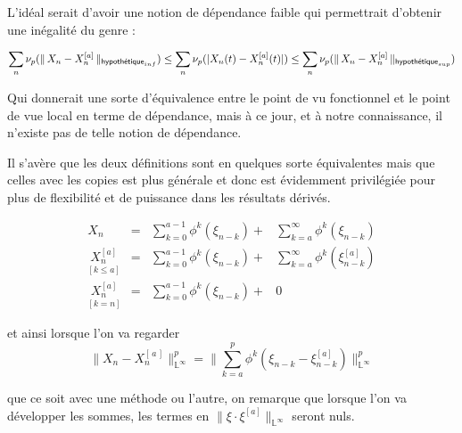 L'idéal serait d'avoir une notion de dépendance faible qui permettrait d'obtenir une inégalité du genre :

$$\sum_n \nu_p(\distnorme {\textsf{hypothétique}_{inf}} {X_n}{X_n^{[a]}}) \leq \sum_n \nu_p( |X_n(t) - X_n^{[a]}(t)| ) \leq \sum_n \nu_p(\distnorme {\textsf{hypothétique}_{sup}} {X_n}{X_n^{[a]}})$$

Qui donnerait une sorte d'équivalence entre le point de vu fonctionnel et le point de vue local en terme de dépendance, mais à ce jour, et à notre connaissance, il n'existe pas de telle notion de dépendance.


Il s'avère que les deux définitions sont en quelques sorte \og équivalentes \fg mais que celles avec les copies est plus générale et donc est évidemment privilégiée pour plus de flexibilité et de puissance dans les résultats dérivés.

\begin{align*}
    X_n &= &\sum\limits_{k=0}^{a-1} \phi^k( \xi_{n-k}) + & \sum\limits_{k=a}^{\infty} \phi^k( \xi_{n-k})
    \\
    \underset {[k\leq a]} {X_n^{[a]}} &= &\sum\limits_{k=0}^{a-1} \phi^k( \xi_{n-k}) + & \sum\limits_{k=a}^{\infty} \phi^k( \xi_{n-k}^{[a]})
    \\
    \underset {[k = n]} {X_n^{[a]}} &= &\sum\limits_{k=0}^{a-1} \phi^k( \xi_{n-k}) + & 0
\end{align*}

et ainsi lorsque l'on va regarder 
$${\lVert {X_n} - {X_n^{[\, a \, ]}} } \rVert_{{\mathds L} ^\infty}^p= \lVert \sum\limits_{k=a}^p \phi^k( \xi_{n-k} - \xi_{n-k}^{[a]}) \rVert_{{\mathds L} ^\infty}^p$$

\noindent que ce soit avec une méthode ou l'autre, on remarque que lorsque l'on va développer les sommes, les termes en $\lVert{\xi \cdot \xi^{[a]}}\rVert_{\mathds L^\infty}$ seront nuls.


\largeskip
\noindent{}

